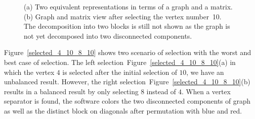 \documentclass[12pt, twoside,a4paper,toc=bibliography]{scrbook}
\newcommand{\figref}[1]{Figure~\protect\ref{#1}}
\begin{document}
\begin{figure}
\centering
{}
\hfill
{}
\caption{
(a) Two equivalent representations in terms of a graph and a matrix.
(b) Graph and matrix view after selecting the vertex number~10.
The decomposition into two blocks is still not shown as the graph is not yet
decomposed into two disconnected components.}
\label{initial_10}
\end{figure}

Figure~\ref{selected_4_10_8_10} shows two scenario of selection with
the worst and best case of selection. The left selection~\figref{selected_4_10_8_10}(a)
in which the vertex
$4$ is selected after the initial selection of $10$, we have an unbalanced result.
However, the right selection~\figref{selected_4_10_8_10}(b) results in a balanced result
by only selecting $8$ instead of $4$.
When a vertex separator is found, the software colors the two disconnected components of graph
as well as the distinct block on diagonals after permutation
with blue and red.
\end{document}
